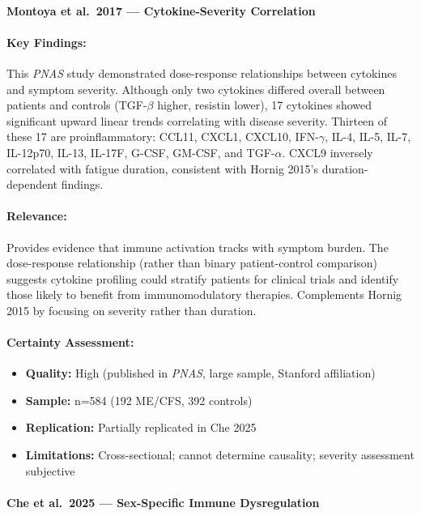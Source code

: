 \paragraph{Montoya et al.\ 2017 --- Cytokine-Severity Correlation}

\cite{Montoya2017}

\paragraph{Key Findings:}
This \emph{PNAS} study demonstrated dose-response relationships between cytokines and symptom severity. Although only two cytokines differed overall between patients and controls (TGF-$\beta$ higher, resistin lower), 17 cytokines showed significant upward linear trends correlating with disease severity. Thirteen of these 17 are proinflammatory: CCL11, CXCL1, CXCL10, IFN-$\gamma$, IL-4, IL-5, IL-7, IL-12p70, IL-13, IL-17F, G-CSF, GM-CSF, and TGF-$\alpha$. CXCL9 inversely correlated with fatigue duration, consistent with Hornig 2015's duration-dependent findings.

\paragraph{Relevance:}
Provides evidence that immune activation tracks with symptom burden. The dose-response relationship (rather than binary patient-control comparison) suggests cytokine profiling could stratify patients for clinical trials and identify those likely to benefit from immunomodulatory therapies. Complements Hornig 2015 by focusing on severity rather than duration.

\paragraph{Certainty Assessment:}
\begin{itemize}
    \item \textbf{Quality:} High (published in \emph{PNAS}, large sample, Stanford affiliation)
    \item \textbf{Sample:} n=584 (192 ME/CFS, 392 controls)
    \item \textbf{Replication:} Partially replicated in Che 2025
    \item \textbf{Limitations:} Cross-sectional; cannot determine causality; severity assessment subjective
\end{itemize}

\paragraph{Che et al.\ 2025 --- Sex-Specific Immune Dysregulation}


